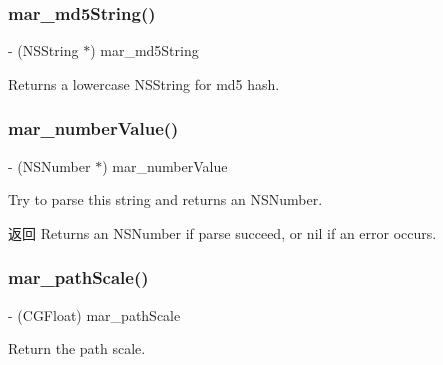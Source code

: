 \subsubsection{\texorpdfstring{mar\+\_\+md5\+String()}{mar\_md5String()}}
{\footnotesize\ttfamily -\/ (N\+S\+String $\ast$) mar\+\_\+md5\+String \begin{DoxyParamCaption}{ }\end{DoxyParamCaption}}

Returns a lowercase N\+S\+String for md5 hash. \mbox{\label{category_n_s_string_07_m_a_r_e_x_08_ab5ce71ebfc101f42e27ad3c05c5acd15}} 
\subsubsection{\texorpdfstring{mar\+\_\+number\+Value()}{mar\_numberValue()}}
{\footnotesize\ttfamily -\/ (N\+S\+Number $\ast$) mar\+\_\+number\+Value \begin{DoxyParamCaption}{ }\end{DoxyParamCaption}}

Try to parse this string and returns an {\ttfamily N\+S\+Number}. \begin{DoxyReturn}{返回}
Returns an {\ttfamily N\+S\+Number} if parse succeed, or nil if an error occurs. 
\end{DoxyReturn}
\mbox{\label{category_n_s_string_07_m_a_r_e_x_08_a6ac5e754e60f5600cb34bc1932d430af}} 
\subsubsection{\texorpdfstring{mar\+\_\+path\+Scale()}{mar\_pathScale()}}
{\footnotesize\ttfamily -\/ (C\+G\+Float) mar\+\_\+path\+Scale \begin{DoxyParamCaption}{ }\end{DoxyParamCaption}}

Return the path scale.

